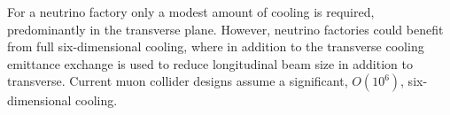 \documentclass{jacow}
\begin{document}
%
%


For a neutrino factory only a modest amount of cooling is required, predominantly in the transverse plane. However, neutrino factories could benefit from full six-dimensional cooling, where in addition to the transverse cooling emittance exchange is used to reduce longitudinal beam size in addition to transverse. Current muon collider designs assume a significant, $O(10^6)$, six-dimensional cooling. %
\end{document}
